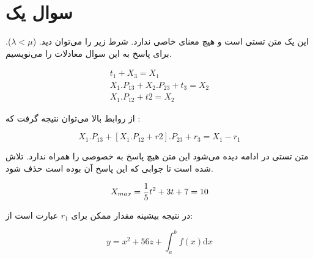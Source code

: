 \section{سوال یک}
این یک متن تستی است و هیچ معنای خاصی ندارد. شرط زیر را می‌توان دید.
($\lambda < \mu $).
برای پاسخ به این سوال معادلات را می‌نویسیم.

\begin{align}
t_1 + X_3 = X_1 \\
X_1 . P_{13} + X_2 . P_{23} + t_3 = X_2 \\
X_1 . P_{12} + t2 = X_2
\end{align}

از روابط بالا می‌توان نتیجه گرفت که :

\begin{equation}
X_1 . P_{13} + [ X_1 . P_{12} + r2 ] . P_{23} + r_3 = X_1 - r_1
\end{equation}


متن تستی در ادامه دیده می‌شود این متن هیچ پاسخ به خصوصی را همراه ندارد.
تلاش شده است تا جوابی که این پاسخ آن بوده است حذف شود.

\begin{equation}
X_{{max}} = {1 \over 5} t^2 + 3t + 7 = 10    
\end{equation}

در نتیجه بیشینه مقدار ممکن برای
$r_1$
عبارت است از:

\begin{equation}
    y = x^2 + 56z + \int_a^b f(x) \mathrm{d}x
\end{equation}
